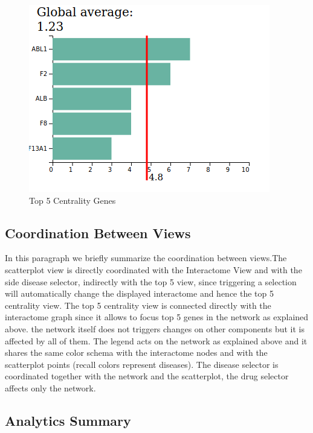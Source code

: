 \documentclass[12pt,twocolumn,twoside]{article}
\begin{document}
\begin{figure}
	\includegraphics[width=.95\linewidth]{top5.png}
	\caption{Top 5 Centrality Genes}
	\label{top5}
\end{figure}

\subsection*{Coordination Between Views}
In this paragraph we briefly summarize the coordination between views.\newline The scatterplot view is directly coordinated with the Interactome View and with the side disease selector, indirectly with the top 5 view, since triggering a selection will automatically change the displayed interactome and hence the top 5 centrality view.
The top 5 centrality view is connected directly with the interactome graph since it allows to focus top 5 genes in the network as explained above. the network itself does not triggers changes on other components but it is affected by all of them. The legend acts on the network as explained above and it shares the same color schema with the interactome nodes and with the scatterplot points (recall colors represent diseases). The disease selector is coordinated together with the network and the scatterplot, the drug selector affects only the network.


\subsection*{Analytics Summary}

\clearpage

 
\end{document}
